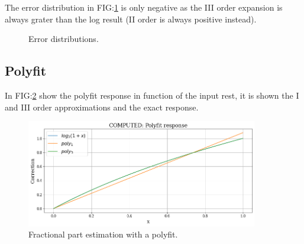 \documentclass[12pt]{article}
\begin{document}
The error distribution in FIG:\ref{fig:TE_Error} is only negative as the III order expansion is always grater than the log result (II order is always positive instead).
\begin{figure}[h]
    \begin{minipage}[c]{0.5\linewidth}
        \vspace{0pt}
        \centering
    \end{minipage}%
    \hfill%
    \begin{minipage}[c]{0.5\linewidth}
        \vspace{0pt}
        \centering
    \end{minipage}%
    \caption{Error distributions.}
    \label{fig:TE_Error}
\end{figure}

\subsection{Polyfit}

In FIG:\ref{fig:POLY_resp} show the polyfit response in function of the input rest, it is shown the I and III order approximations and the exact response.
\begin{figure}[h]
    \includegraphics[width=0.9\textwidth]{Images/POLY_response.png}
    \caption{Fractional part estimation with a polyfit.}
    \label{fig:POLY_resp}
\end{figure}
\end{document}
